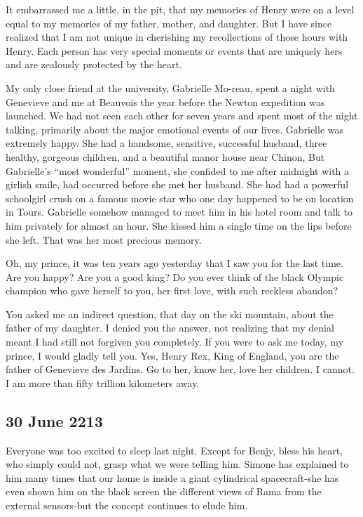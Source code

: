 \documentclass[]{article}
\begin{document}
{It embarrassed me a little, in the pit, that my memories of Henry were on a level equal to my memories of my father, mother, and daughter.  But I have since realized that I am not unique in cherishing my recollections of those hours with Henry.  Each person has very special moments or events that are uniquely hers and are zealously protected by the heart.

My only close friend at the university, Gabrielle Mo-reau, spent a night with Genevieve and me at Beauvois the year before the Newton expedition was launched.  We had not seen each other for seven years and spent most of the night talking, primarily about the major emotional events of our lives.  Gabrielle was extremely happy.  She had a handsome, sensitive, successful husband, three healthy, gorgeous children, and a beautiful manor house near Chinon, But Gabrielle’s “most wonderful” moment, she confided to me after midnight with a girlish smile, had occurred before she met her husband.  She had had a powerful schoolgirl crush on a famous movie star who one day happened to be on location in Tours.  Gabrielle somehow managed to meet him in his hotel room and talk to him privately for almost an hour.  She kissed him a single time on the lips before she left.  That was her most precious memory.

Oh, my prince, it was ten years ago yesterday that I saw you for the last time.  Are you happy? Are you a good king? Do you ever think of the black Olympic champion who gave herself to you, her first love, with such reckless abandon?

You asked me an indirect question, that day on the ski mountain, about the father of my daughter.  I denied you the answer, not realizing that my denial meant I had still not forgiven you completely.  If you were to ask me today, my prince, I would gladly tell you.  Yes, Henry Rex, King of England, you are the father of Genevieve des Jardins.  Go to her, know her, love her children.  I cannot.  I am more than fifty trillion kilometers away.

\subsection*{30 June 2213}

Everyone was too excited to sleep last night.  Except for Benjy, bless his heart, who simply could not, grasp what we were telling him.  Simone has explained to him many times that our home is inside a giant cylindrical spacecraft-she has even shown him on the black screen the different views of Rama from the external sensors-but the concept continues to elude him.

}
\end{document}
